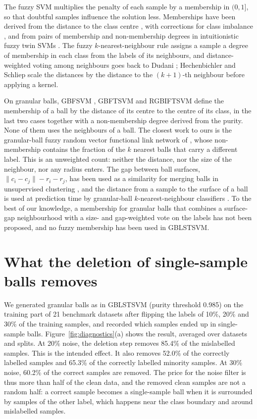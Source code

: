 \documentclass[preprint,12pt]{elsarticle}
\begin{document}
The fuzzy SVM \cite{lin2002} multiplies the penalty of each sample by a membership in $(0,1]$, so that doubtful samples influence the solution less. Memberships have been derived from the distance to the class centre \cite{lin2002}, with corrections for class imbalance \cite{batuwita2010}, and from pairs of membership and non-membership degrees in intuitionistic fuzzy twin SVMs \cite{rezvani2019}. The fuzzy $k$-nearest-neighbour rule \cite{keller1985} assigns a sample a degree of membership in each class from the labels of its neighbours, and distance-weighted voting among neighbours goes back to Dudani \cite{dudani1976}; Hechenbichler and Schliep \cite{hechenbichler2004} scale the distances by the distance to the $(k+1)$-th neighbour before applying a kernel.

On granular balls, GBFSVM \cite{xia2024gbfsvm}, GBFTSVM \cite{lang2025gbftsvm} and RGBIFTSVM \cite{liu2026rgbiftsvm} define the membership of a ball by the distance of its centre to the centre of its class, in the last two cases together with a non-membership degree derived from the purity. None of them uses the neighbours of a ball. The closest work to ours is the granular-ball fuzzy random vector functional link network of \cite{quadir2026gbfrvfl}, whose non-membership contains the fraction of the $k$ nearest balls that carry a different label. This is an unweighted count: neither the distance, nor the size of the neighbour, nor any radius enters. The gap between ball surfaces, $\lVert c_i-c_j\rVert-r_i-r_j$, has been used as a similarity for merging balls in unsupervised clustering \cite{xia2024gbct}, and the distance from a sample to the surface of a ball is used at prediction time by granular-ball $k$-nearest-neighbour classifiers \cite{xia2019}. To the best of our knowledge, a membership for granular balls that combines a surface-gap neighbourhood with a size- and gap-weighted vote on the labels has not been proposed, and no fuzzy membership has been used in GBLSTSVM.

\section{What the deletion of single-sample balls removes}
\label{sec:motivation}

We generated granular balls as in GBLSTSVM (purity threshold 0.985) on the training part of 21 benchmark datasets after flipping the labels of 10\%, 20\% and 30\% of the training samples, and recorded which samples ended up in single-sample balls. Figure~\ref{fig:diagnostics}(a) shows the result, averaged over datasets and splits. At 20\% noise, the deletion step removes 85.4\% of the mislabelled samples. This is the intended effect. It also removes 52.0\% of the correctly labelled samples and 65.3\% of the correctly labelled minority samples. At 30\% noise, 60.2\% of the correct samples are removed. The price for the noise filter is thus more than half of the clean data, and the removed clean samples are not a random half: a correct sample becomes a single-sample ball when it is surrounded by samples of the other label, which happens near the class boundary and around mislabelled samples.
\end{document}
